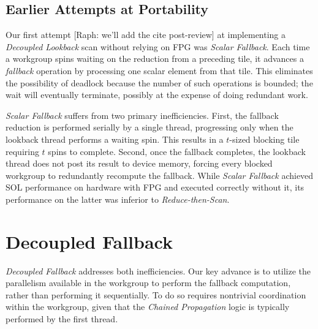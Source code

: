 \documentclass[acmsmall, manuscript, screen, review, anonymous]{acmart}
\newcommand{\raph}[1]{{\footnotesize\color{magenta}[Raph: #1]}}
\begin{document}
\subsection{Earlier Attempts at Portability}
Our first attempt \raph{we'll add the cite post-review} at implementing a \emph{Decoupled Lookback} scan without relying on FPG was \emph{Scalar Fallback}. Each time a workgroup spins waiting on the reduction from a preceding tile, it advances a \emph{fallback} operation by processing one scalar element from that tile. This eliminates the possibility of deadlock because the number of such operations is bounded; the wait will eventually terminate, possibly at the expense of doing redundant work.

\emph{Scalar Fallback} suffers from two primary inefficiencies. First, the fallback reduction is performed serially by a single thread, progressing only when the lookback thread performs a waiting spin. This results in a $t$-sized blocking tile requiring $t$ spins to complete. Second, once the fallback completes, the lookback thread does not post its result to device memory, forcing every blocked workgroup to redundantly recompute the fallback. While \emph{Scalar Fallback} achieved SOL performance on hardware with FPG and executed correctly without it, its performance on the latter was inferior to \emph{Reduce-then-Scan}.

\section{Decoupled Fallback}
\emph{Decoupled Fallback} addresses both inefficiencies. Our key advance is to utilize the parallelism available in the workgroup to perform the fallback computation, rather than performing it sequentially. To do so requires nontrivial coordination within the workgroup, given that the \emph{Chained Propagation} logic is typically performed by the first thread.
\end{document}
